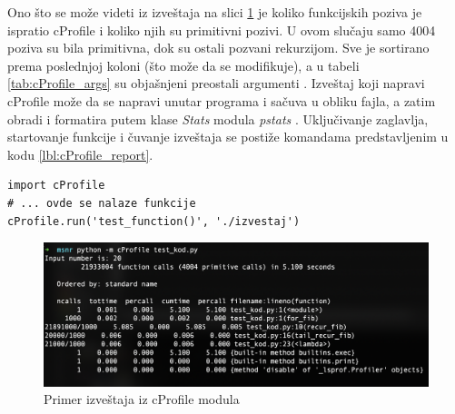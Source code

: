 \documentclass[a4paper]{article}
\begin{document}
Ono što se može videti iz izveštaja na slici \ref{fig:cProfile_no_import} je koliko funkcijskih poziva je ispratio cProfile i koliko njih su primitivni pozivi. U ovom slučaju samo 4004 poziva su bila primitivna, dok su ostali pozvani rekurzijom. Sve je sortirano prema poslednjoj koloni (što može da se modifikuje), a u tabeli \ref{tab:cProfile_args} su objašnjeni preostali argumenti \cite{cProfile}. Izveštaj koji napravi cProfile može da se napravi unutar programa i sačuva u obliku fajla, a zatim obradi i formatira putem klase {\em Stats} modula {\em pstats} \cite{StatsClass}. Uključivanje zaglavlja, startovanje funkcije i čuvanje izveštaja se postiže komandama predstavljenim u kodu \ref{lbl:cProfile_report}.
\begin{lstlisting}[caption={Primer čuvanja izveštaja u fajl},frame=single, label=lbl:cProfile_report]
import cProfile
# ... ovde se nalaze funkcije
cProfile.run('test_function()', './izvestaj')
\end{lstlisting}

\begin{figure}[h!]
\begin{center}
\includegraphics[scale=0.4]{cProfile_without_import.png}
\end{center}
\caption{Primer izveštaja iz cProfile modula}
\label{fig:cProfile_no_import}
\end{figure} 
\end{document}
